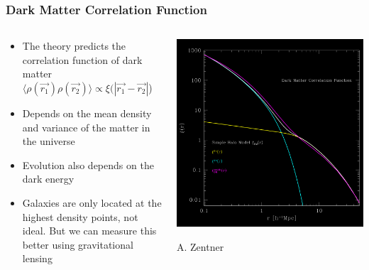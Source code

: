 \documentclass{beamer}
\begin{document}
\frame
{

    \frametitle{Dark Matter Correlation Function}


    \begin{columns}
        \begin{column}{0.5\textwidth}
            \begin{itemize}

                \item The theory predicts the correlation function of
                    dark matter
                    {\color{gold} $\langle \rho(\vec{r_1}) \rho(\vec{r_2})
                    \rangle \propto \xi(|\vec{r_1} - \vec{r_2}|$) }

                \item Depends on the mean density and variance of the matter 
                    in the universe

                \item Evolution also depends on the dark energy
 
                \item Galaxies are only located at the highest density points,
                    not ideal.  But we can measure this better using
                    {\color{lightskyblue} gravitational lensing}

            \end{itemize}

        \end{column}
        \begin{column}{0.5\textwidth}
            \begin{center}
                \includegraphics[width=\textwidth]{zentner-halo-model-inv.png}
            \end{center}
            {\tiny A. Zentner}
        \end{column}

    \end{columns}


}
\end{document}

